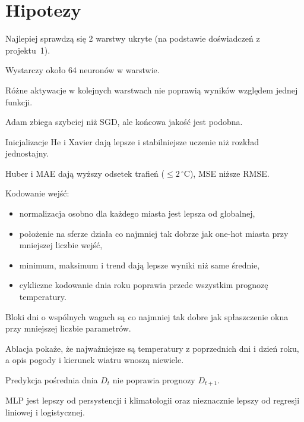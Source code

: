 \documentclass{article}
\begin{document}
\section{Hipotezy}
\begin{punkty}
  \item Najlepiej sprawdzą się 2 warstwy ukryte (na podstawie doświadczeń z projektu~1).
  \item Wystarczy około 64 neuronów w warstwie.
  \item Różne aktywacje w kolejnych warstwach nie poprawią wyników względem jednej funkcji.
  \item Adam zbiega szybciej niż SGD, ale końcowa jakość jest podobna.
  \item Inicjalizacje He i Xavier dają lepsze i stabilniejsze uczenie niż rozkład jednostajny.
  \item Huber i MAE dają wyższy odsetek trafień ($\le 2\,^\circ$C), MSE niższe RMSE.
  \item Kodowanie wejść:
    \begin{itemize}
      \item normalizacja osobno dla każdego miasta jest lepsza od globalnej,
      \item położenie na sferze działa co najmniej tak dobrze jak one-hot miasta przy mniejszej liczbie wejść,
      \item minimum, maksimum i trend dają lepsze wyniki niż same średnie,
      \item cykliczne kodowanie dnia roku poprawia przede wszystkim prognozę temperatury.
    \end{itemize}
  \item Bloki dni o wspólnych wagach są co najmniej tak dobre jak spłaszczenie okna przy mniejszej liczbie parametrów.
  \item Ablacja pokaże, że najważniejsze są temperatury z poprzednich dni i dzień roku, a opis pogody i kierunek wiatru wnoszą niewiele.
  \item Predykcja pośrednia dnia $D_t$ nie poprawia prognozy $D_{t+1}$.
  \item MLP jest lepszy od persystencji i klimatologii oraz nieznacznie lepszy od regresji liniowej i logistycznej.
\end{punkty}
\end{document}
